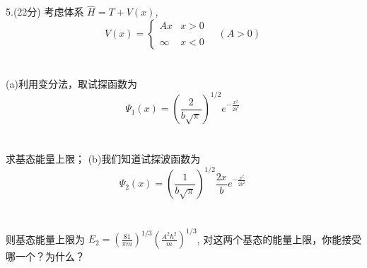 5.(22分) 考虑体系 $\hat{H} = T + V(x)$,
  $$ V(x) = \begin{cases}     A x & x > 0 \\\\     \infty & x < 0     \end{cases} \quad (A > 0)~$$\\\\
 (a)利用变分法，取试探函数为
  $$\Psi_1(x) = \left( \frac{2}{b\sqrt{\pi}} \right)^{1/2} e^{-\frac{x^2}{2b^2}}~$$\\\\
求基态能量上限；
 (b)我们知道试探波函数为
$$\Psi_2(x) = \left( \frac{1}{b\sqrt{\pi}} \right)^{1/2} \frac{2x}{b} e^{-\frac{x^2}{2b^2}} ~$$\\\\
则基态能量上限为 $E_2 =  \left(\frac{81}{\pi m}\right)^{1/3} \left(\frac{A^2 \hbar^2}{m} \right)^{1/3}$, 对这两个基态的能量上限，你能接受哪一个？为什么？

